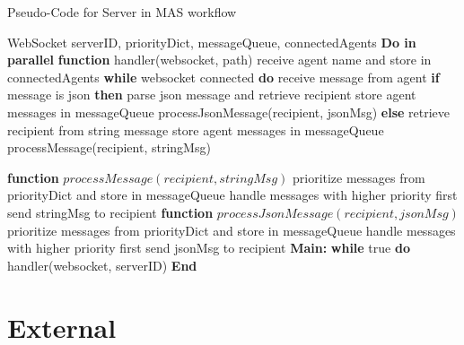 \begin{algorithm}
    \caption{Pseudo-Code for Server in MAS workflow}
    \label{alg:ServerPseudoCode}
    \begin{algorithmic}[1]
         WebSocket
         serverID, priorityDict, messageQueue, connectedAgents
        \State \textbf{Do in parallel}
        \State \textbf{\qquad function} handler(websocket, path)  
        \State \textbf \qquad \qquad receive agent name and store in connectedAgents
        \State \textbf {\qquad \qquad while} websocket connected \textbf{do} 
        \State \textbf \qquad \qquad \qquad receive message from agent   
        \State \textbf{\qquad \qquad \qquad if} {message is json} \textbf{then}
        \State \textbf \qquad \qquad \qquad \qquad parse json message and retrieve recipient
        \State \textbf \qquad \qquad \qquad \qquad store agent messages in messageQueue  
        \State \textbf \qquad \qquad \qquad \qquad processJsonMessage(recipient, jsonMsg)
        \State \textbf{\qquad \qquad \qquad else}  
        \State \textbf \qquad \qquad \qquad \qquad retrieve recipient from string message
        \State \textbf \qquad \qquad \qquad \qquad store agent messages in messageQueue  
        \State \textbf \qquad \qquad \qquad \qquad processMessage(recipient, stringMsg)
        
        \State \textbf{\qquad function} $processMessage(recipient, stringMsg)$   
        \State \textbf \qquad \qquad prioritize messages from priorityDict and store in messageQueue 
        \State \textbf \qquad \qquad handle messages with higher priority first   
        \State \textbf \qquad \qquad send stringMsg to recipient 
        \State \textbf{\qquad function} $processJsonMessage(recipient, jsonMsg)$   
        \State \textbf \qquad \qquad prioritize messages from priorityDict and store in messageQueue
        \State \textbf \qquad \qquad handle messages with higher priority first 
        \State \textbf \qquad \qquad send jsonMsg to recipient
        \State \textbf{Main:}   
        \State \textbf {\qquad while} true \textbf {do}
        \State \textbf \qquad \qquad handler(websocket, serverID) 
        \State \textbf{End}                 
    \end{algorithmic}
\end{algorithm}




\section{External}
